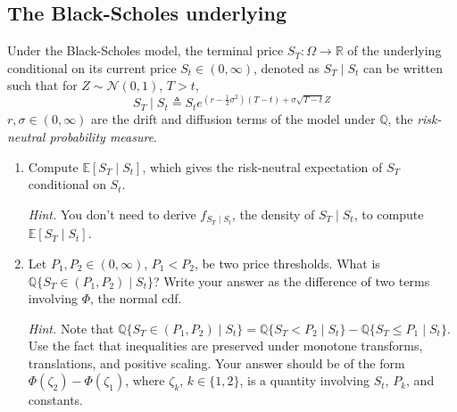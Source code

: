 \documentclass{article}
\numberwithin{equation}{section}
\begin{document}
\subsection{The Black-Scholes underlying}

Under the Black-Scholes model, the terminal price $ S_T : \Omega \rightarrow
\mathbb{R} $ of the underlying conditional on its current price $ S_t \in
(0, \infty) $, denoted as $ S_T \mid S_t $ can be written such that for
$ Z \sim \mathcal{N}(0, 1) $, $ T > t $,
\begin{equation*}
    S_T \mid S_t \triangleq S_te^{
        \left(r - \frac{1}{2}\sigma^2\right)(T - t) + \sigma\sqrt{T - t}Z
    }
\end{equation*}
$ r, \sigma \in (0, \infty) $ are the drift and diffusion terms of the
model under $ \mathbb{Q} $, the \textit{risk-neutral probability
measure}\footnotemark{}.
\begin{enumerate}[label = \alph*.]
    \item
    Compute $ \mathbb{E}[S_T \mid S_t] $, which gives the risk-neutral
    expectation of $ S_T $ conditional on $ S_t $.

    \medskip
    
    \textit{Hint.} You don't need to derive $ f_{S_T \mid S_t} $, the density
    of $ S_T \mid S_t $, to compute $ \mathbb{E}[S_T \mid  S_t] $.

    \item
    Let $ P_1, P_2 \in (0, \infty) $, $ P_1 < P_2 $, be two price thresholds.
    What is $ \mathbb{Q}\{S_T \in (P_1, P_2) \mid S_t\} $? Write your answer
    as the difference of two terms involving $ \Phi $, the normal cdf.

    \medskip

    \textit{Hint.} Note that $ \mathbb{Q}\{S_T \in (P_1, P_2) \mid S_t\} =
    \mathbb{Q}\{S_T < P_2 \mid S_t\} - \mathbb{Q}\{S_T \le P_1 \mid S_t\} $.
    Use the fact that inequalities are preserved under monotone transforms,
    translations, and positive scaling. Your answer should be of the form
    $ \Phi(\zeta_2) - \Phi(\zeta_1) $, where $ \zeta_k $, $ k \in \{1, 2\} $,
    is a quantity involving $ S_t $, $ P_k $, and constants.
\end{enumerate}
\end{document}
